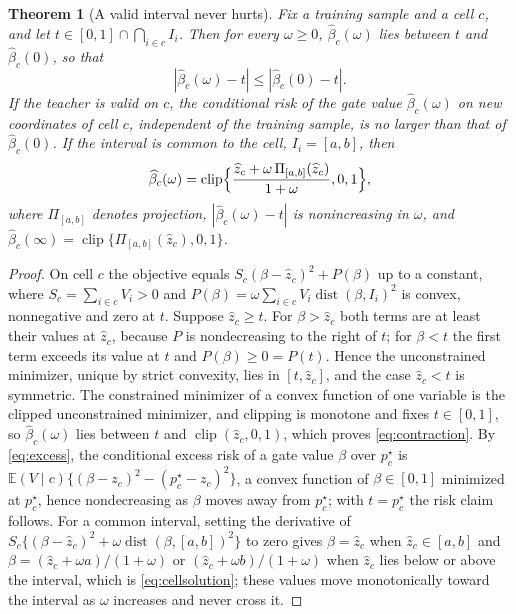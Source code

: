 \documentclass[11pt]{article}
\theoremstyle{plain}
\newtheorem{theorem}{Theorem}
\theoremstyle{definition}
\theoremstyle{remark}
\newcommand{\E}{\mathbb E}
\DeclareMathOperator{\clip}{clip}
\DeclareMathOperator{\dist}{dist}
\begin{document}
\begin{theorem}[A valid interval never hurts]\label{thm:valid}
Fix a training sample and a cell $c$, and let $t\in[0,1]\cap\bigcap_{i\in c}I_i$. Then for
every $\omega\ge0$, $\widehat\beta_c(\omega)$ lies between $t$ and $\widehat\beta_c(0)$, so
that
\begin{equation}\label{eq:contraction}
|\widehat\beta_c(\omega)-t|\le|\widehat\beta_c(0)-t|.
\end{equation}
If the teacher is valid on $c$, the conditional risk of the gate value
$\widehat\beta_c(\omega)$ on new coordinates of cell $c$, independent of the training
sample, is no larger than that of $\widehat\beta_c(0)$. If the interval is common to the
cell, $I_i=[a,b]$, then
\begin{equation}\label{eq:cellsolution}
\widehat\beta_c(\omega)=\clip\Bigl\{\frac{\widehat z_c+\omega\,\Pi_{[a,b]}(\widehat z_c)}
{1+\omega},0,1\Bigr\},
\end{equation}
where $\Pi_{[a,b]}$ denotes projection, $|\widehat\beta_c(\omega)-t|$ is nonincreasing in
$\omega$, and $\widehat\beta_c(\infty)=\clip\{\Pi_{[a,b]}(\widehat z_c),0,1\}$.
\end{theorem}

\begin{proof}
On cell $c$ the objective equals $S_c(\beta-\widehat z_c)^2+P(\beta)$ up to a constant,
where $S_c=\sum_{i\in c}V_i>0$ and $P(\beta)=\omega\sum_{i\in c}V_i\dist(\beta,I_i)^2$ is
convex, nonnegative and zero at $t$. Suppose $\widehat z_c\ge t$. For $\beta>\widehat z_c$
both terms are at least their values at $\widehat z_c$, because $P$ is nondecreasing to the
right of $t$; for $\beta<t$ the first term exceeds its value at $t$ and $P(\beta)\ge0=P(t)$.
Hence the unconstrained minimizer, unique by strict convexity, lies in $[t,\widehat z_c]$,
and the case $\widehat z_c<t$ is symmetric. The constrained minimizer of a convex function
of one variable is the clipped unconstrained minimizer, and clipping is monotone and fixes
$t\in[0,1]$, so $\widehat\beta_c(\omega)$ lies between $t$ and $\clip(\widehat z_c,0,1)$,
which proves \eqref{eq:contraction}. By \eqref{eq:excess}, the conditional excess risk of a
gate value $\beta$ over $p_c^\star$ is $\E(V\mid c)\{(\beta-z_c)^2-(p_c^\star-z_c)^2\}$, a
convex function of $\beta\in[0,1]$ minimized at $p_c^\star$, hence nondecreasing as $\beta$
moves away from $p_c^\star$; with $t=p_c^\star$ the risk claim follows. For a common
interval, setting the derivative of $S_c\{(\beta-\widehat z_c)^2+\omega\dist(\beta,[a,b])^2\}$
to zero gives $\beta=\widehat z_c$ when $\widehat z_c\in[a,b]$ and $\beta=(\widehat
z_c+\omega a)/(1+\omega)$ or $(\widehat z_c+\omega b)/(1+\omega)$ when $\widehat z_c$ lies
below or above the interval, which is \eqref{eq:cellsolution}; these values move
monotonically toward the interval as $\omega$ increases and never cross it.
\end{proof}
\end{document}
